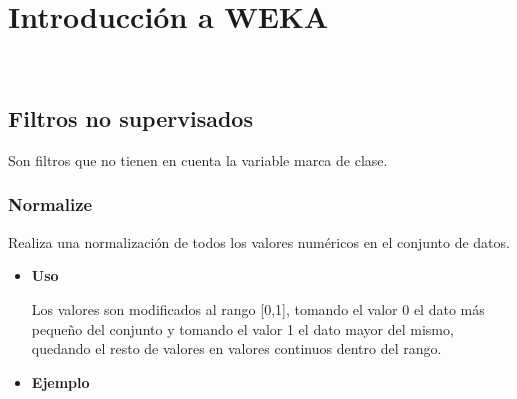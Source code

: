 \chapter{Introducción a WEKA}

\
\section{Filtros no supervisados}
Son filtros que no tienen en cuenta la variable marca de clase.
	\subsection{Normalize}
	\begin{justify}
		Realiza una normalización de todos los valores numéricos en el conjunto de datos. 
	\end{justify}

	\begin{itemize}
	\item \textbf{Uso}
		\begin{justify}
			Los valores son modificados al rango [0,1], tomando el valor 0 el dato más pequeño del conjunto y tomando el valor 1 el dato mayor del mismo, quedando el resto de valores en valores continuos dentro del rango.
		\end{justify}




		\item \textbf{Ejemplo}

		
	\end{itemize}

